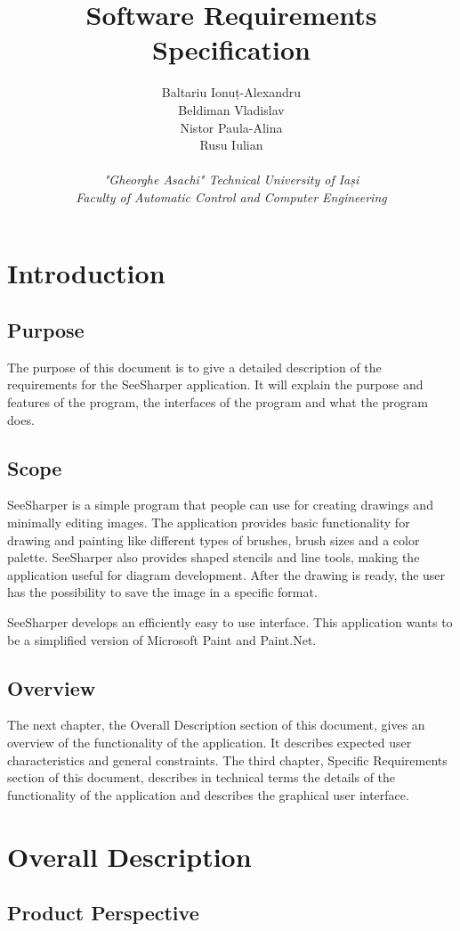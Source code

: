 \documentclass{article}
\title{\textbf{Software Requirements Specification}}
\author
{
	Baltariu Ionuț-Alexandru
	\\
	Beldiman Vladislav
	\\
	Nistor Paula-Alina 
	\\
	Rusu Iulian
	\\
	\\
	\textit{"Gheorghe Asachi" Technical University of Iași}
	\\
	\textit{Faculty of Automatic Control and Computer Engineering}
}
\date{}
\begin{document}
\maketitle 

\newpage
\tableofcontents
\newpage

\section{Introduction}
\subsection{Purpose}
The purpose of this document is to give a detailed description of the requirements for the SeeSharper application.
It will explain the purpose and features of the program, the interfaces of the program and what the program does.

\subsection{Scope}
SeeSharper is a simple program that people can use for creating drawings and minimally editing images. The application provides basic functionality for drawing and painting like different types of brushes, brush sizes and a color palette. 
SeeSharper also provides shaped stencils and line tools, making the application useful for diagram development. After the drawing is ready, the user has the possibility to save the image in a specific format.

SeeSharper develops an efficiently easy to use interface. This application wants to be a simplified version of Microsoft Paint and Paint.Net.

\subsection{Overview}
The next chapter, the Overall Description section of this document, gives an overview of the functionality of the application. It describes expected user characteristics and general constraints. The third chapter, Specific Requirements section of this document, describes in technical terms the details of the functionality of the application and describes the graphical  user  interface.	

\section{Overall Description}
\subsection{Product Perspective}
\end{document}
